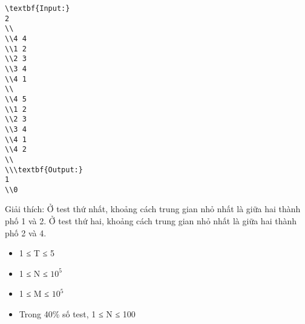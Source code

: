 \begin{verbatim}
\textbf{Input:}
2
\\
\\4 4
\\1 2
\\2 3
\\3 4
\\4 1
\\
\\4 5 
\\1 2
\\2 3
\\3 4
\\4 1
\\4 2
\\
\\\textbf{Output:}
1
\\0\end{verbatim}

Giải thích: Ở test thứ nhất, khoảng cách trung gian nhỏ nhất là giữa hai thành phố 1 và 2. Ở test thứ hai, khoảng cách trung gian nhỏ nhất là giữa hai thành phố 2 và 4.
\begin{itemize}
	\item     1 ≤ T ≤ 5   
	\item     1 ≤ N ≤ $10^{5}$
	\item     1 ≤ M ≤ $10^{5}$
	\item     Trong 40\% số test, 1 ≤ N ≤ 100   
\end{itemize}
